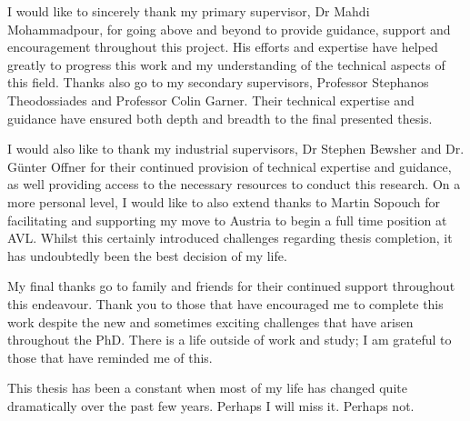 
\begin{acknowledgements}      

I would like to sincerely thank my primary supervisor, Dr Mahdi Mohammadpour, for going above and beyond to provide guidance, support and encouragement throughout this project. His efforts and expertise have helped greatly to progress this work and my understanding of the technical aspects of this field. Thanks also go to my secondary supervisors, Professor Stephanos Theodossiades and Professor Colin Garner. Their technical expertise and guidance have ensured both depth and breadth to the final presented thesis.

I would also like to thank my industrial supervisors, Dr Stephen Bewsher and Dr. Günter Offner for their continued provision of technical expertise and guidance, as well providing access to the necessary resources to conduct this research. On a more personal level, I would like to also extend thanks to Martin Sopouch for facilitating and supporting my move to Austria to begin a full time position at AVL. Whilst this certainly introduced challenges regarding thesis completion, it has undoubtedly been the best decision of my life.

My final thanks go to family and friends for their continued support throughout this endeavour. Thank you to those that have encouraged me to complete this work despite the new and sometimes exciting challenges that have arisen throughout the PhD. There is a life outside of work and study; I am grateful to those that have reminded me of this.

This thesis has been a constant when most of my life has changed quite dramatically over the past few years. Perhaps I will miss it. Perhaps not.

\end{acknowledgements}
